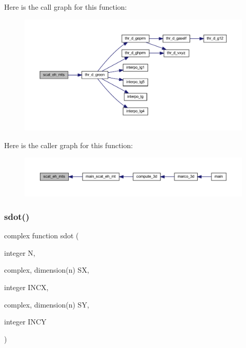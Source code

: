 Here is the call graph for this function\+:
\nopagebreak
\begin{figure}[H]
\begin{center}
\leavevmode
\includegraphics[width=350pt]{Marco_8f90_a5b2af6ff73b05f7fda72228c32b99715_cgraph}
\end{center}
\end{figure}
Here is the caller graph for this function\+:
\nopagebreak
\begin{figure}[H]
\begin{center}
\leavevmode
\includegraphics[width=350pt]{Marco_8f90_a5b2af6ff73b05f7fda72228c32b99715_icgraph}
\end{center}
\end{figure}
\mbox{\label{Marco_8f90_a69f15032629f95611ede01cc8916bfc0}} 
\subsubsection{\texorpdfstring{sdot()}{sdot()}}
{\footnotesize\ttfamily complex function sdot (\begin{DoxyParamCaption}\item[{integer}]{N,  }\item[{complex, dimension(n)}]{SX,  }\item[{integer}]{I\+N\+CX,  }\item[{complex, dimension(n)}]{SY,  }\item[{integer}]{I\+N\+CY }\end{DoxyParamCaption})}

